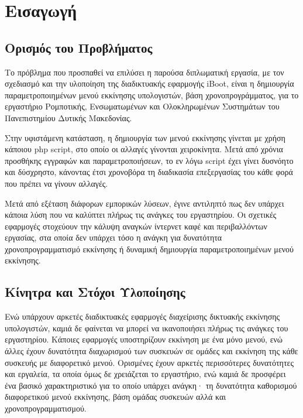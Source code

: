 \chapter{Εισαγωγή}
\section{Ορισμός του Προβλήματος}
Το πρόβλημα που προσπαθεί να επιλύσει η παρούσα διπλωματική εργασία, με τον σχεδιασμό και την υλοποίηση της διαδικτυακής εφαρμογής iBoot, είναι η δημιουργία παραμετροποιημένων μενού εκκίνησης υπολογιστών, βάση χρονοπρογράμματος, για το εργαστήριο Ρομποτικής, Ενσωματωμένων και Ολοκληρωμένων Συστημάτων του Πανεπιστημίου Δυτικής Μακεδονίας.

Στην υφιστάμενη κατάσταση, η δημιουργία των μενού εκκίνησης γίνεται με χρήση κάποιου php script, στο οποίο οι αλλαγές γίνονται χειροκίνητα. Μετά από χρόνια προσθήκης εγγραφών και παραμετροποιήσεων, το εν λόγω script έχει γίνει δυσνόητο και δύσχρηστο, κάνοντας έτσι χρονοβόρα τη διαδικασία επεξεργασίας του κάθε φορά που πρέπει να γίνουν αλλαγές.

Μετά από εξέταση διάφορων εμπορικών λύσεων, έγινε αντιληπτό πως δεν υπάρχει κάποια λύση που να καλύπτει πλήρως τις ανάγκες του εργαστηρίου. Οι σχετικές εφαρμογές στοχεύουν την κάλυψη αναγκών ίντερνετ καφέ και περιβαλλόντων εργασίας, στα οποία δεν υπάρχει τόσο η ανάγκη για δυνατότητα χρονοπρογραμματισμό εκκίνησης ή δυναμική δημιουργία παραμετροποιημένων μενού εκκίνησης.

\section{Κίνητρα και Στόχοι Υλοποίησης}
Ενώ υπάρχουν αρκετές διαδικτυακές εφαρμογές διαχείρισης δικτυακής εκκίνησης υπολογιστών, καμιά δε φαίνεται να μπορεί να ικανοποιήσει πλήρως τις ανάγκες του εργαστηρίου. Κάποιες εφαρμογές υποστηρίζουν εκκίνηση με ένα μόνο μενού, ενώ άλλες έχουν δυνατότητα διαχωρισμού των συσκευών σε ομάδες και εκκίνηση της κάθε συσκευής με διαφορετικό μενού. Ορισμένες έχουν αρκετές περισσότερες δυνατότητες και εργαλεία, τα οποία όμως δε χρειάζεται το εργαστήριο, ενώ καμιά δε προσφέρει ένα βασικό χαρακτηριστικό για το οποίο υπάρχει ανάγκη· τη δυνατότητα καθορισμού διαφορετικού μενού εκκίνησης, βάση ομάδας συσκευών αλλά και χρονοπρογραμματισμού.

